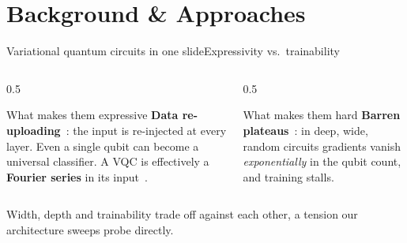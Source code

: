 \section{Background \& Approaches}

\begin{frame}{Variational quantum circuits in one slide}{Expressivity vs.\ trainability}
    \begin{columns}[T]
        \begin{column}{0.5\textwidth}
            \begin{block}{What makes them expressive}
                \textbf{Data re-uploading}~\cite{perezsalinas2020reuploading}: the
                input is re-injected at every layer. Even a single qubit can become
                a universal classifier. A VQC is effectively a \textbf{Fourier
                    series} in its input~\cite{schuld2021encoding}.
            \end{block}
        \end{column}
        \begin{column}{0.5\textwidth}
            \begin{alertblock}{What makes them hard}
                \textbf{Barren plateaus}~\cite{mcclean2018barren}: in deep, wide,
                random circuits gradients vanish \emph{exponentially} in the qubit
                count, and training stalls.
            \end{alertblock}
        \end{column}
    \end{columns}
    \vspace{2pt}
    \begin{callout}
        Width, depth and trainability trade off against each other, a tension our
        architecture sweeps probe directly.
    \end{callout}
\end{frame}

